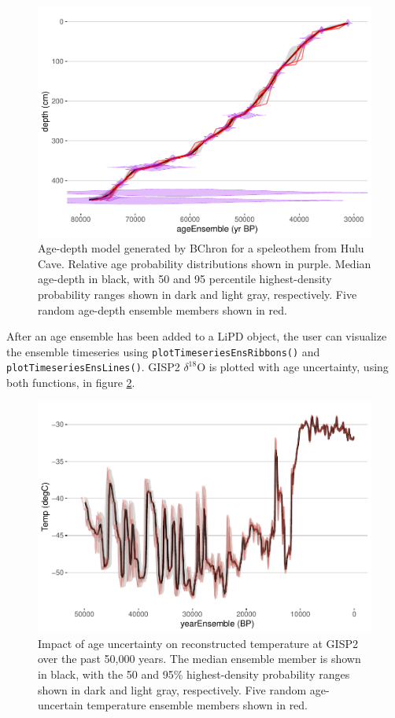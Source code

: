 \documentclass[gchron, manuscript]{copernicus}
\begin{document}
\begin{figure}
\includegraphics[width=12cm]{geoChronR-paper_files/figure-latex/age-model-1} \caption{Age-depth model generated by BChron for a speleothem from Hulu Cave. Relative age probability distributions shown in purple. Median age-depth in black, with 50 and 95 percentile highest-density probability ranges shown in dark and light gray, respectively. Five random age-depth ensemble members shown in red.}\label{fig:age-model}
\end{figure}

After an age ensemble has been added to a LiPD object, the user can visualize the ensemble timeseries using \texttt{plotTimeseriesEnsRibbons()} and \texttt{plotTimeseriesEnsLines()}.
GISP2 \(\delta^{18}\)O is plotted with age uncertainty, using both functions, in figure \ref{fig:timeseries}.

\begin{figure}
\includegraphics[width=12cm]{geoChronR-paper_files/figure-latex/timeseries-1} \caption{Impact of age uncertainty on reconstructed temperature at GISP2 over the past 50,000 years. The median ensemble member is shown in black, with the 50 and 95\% highest-density probability ranges shown in dark and light gray, respectively. Five random age-uncertain temperature ensemble members shown in red.}\label{fig:timeseries}
\end{figure}
\end{document}
